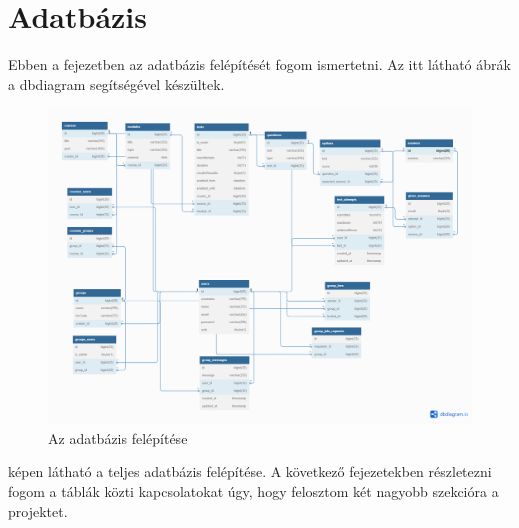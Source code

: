 \documentclass[
]{thesis-ekf}
\theoremstyle{definition}
\theoremstyle{remark}
\begin{document}
        \chapter{Adatbázis}\label{Adatbazis}
        Ebben a fejezetben az adatbázis felépítését fogom ismertetni. Az itt látható ábrák a  dbdiagram\cite{DBDiagram} segítségével készültek.
            \begin{figure}[ht!]
		        \centering
		        \includegraphics[width=15cm]{Vizsgaztato.png}
		        \caption{Az adatbázis felépítése}
                \label{fig-db-teljes}
	    \end{figure}
            \Az{\ref{fig-db-teljes}} képen látható a teljes adatbázis felépítése. A következő fejezetekben részletezni fogom a táblák közti kapcsolatokat úgy, hogy felosztom két nagyobb szekcióra a projektet.
\end{document}
